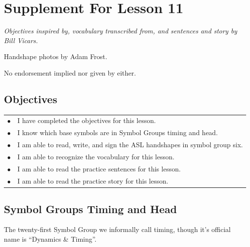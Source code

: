 \documentclass{article}
\begin{document}
\newfontfamily{}
\newfontfamily{}
\newcommand{\bul}{\hfil$\bullet$&}
\renewenvironment{glossary}{\begin{multicols}{5}\begin{center}}{\end{center}\end{multicols}}
\setcounter{secnumdepth}{0}
\setlength{\columnseprule}{1pt}

\section{Supplement For Lesson 11}

\begin{center}
\it
Objectives inspired by, vocabulary transcribed from, and sentences and story by Bill Vicars.

Handshape photos by Adam Frost.

No endorsement implied nor given by either.
\end{center}

\subsection{Objectives}

\begin{tabular}{p{1cm}p{14cm}}
\bul I have completed the objectives for this lesson.\\
\bul I know which base symbols are in Symbol Groups timing and head.\\
\bul I am able to read, write, and sign the ASL handshapes in symbol group six.\\
\bul I am able to recognize the vocabulary for this lesson.\\
\bul I am able to read the practice sentences for this lesson.\\
\bul I am able to read the practice story for this lesson.\\
\end{tabular}

\subsection{Symbol Groups Timing and Head}

The twenty-first Symbol Group we informally call timing, though it's official name is ``Dynamics \& Timing''.
\end{document}
